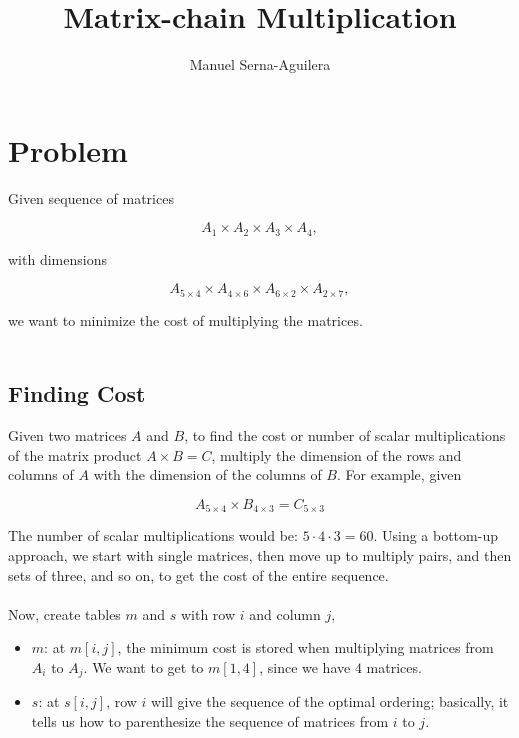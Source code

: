 \documentclass[12pt]{article}
\title{Matrix-chain Multiplication}
\author{Manuel Serna-Aguilera}
\date{}
\begin{document}
\maketitle

\section*{Problem}
Given sequence of matrices

\begin{equation*}
    A_1 \times A_2 \times A_3 \times A_4,
\end{equation*}

with dimensions

\begin{equation*}
    A_{5\times4} \times A_{4\times6} \times A_{6\times2} \times A_{2\times7},
\end{equation*}

we want to minimize the cost of multiplying the matrices. 
\\ \\
\subsection*{Finding Cost}
Given two matrices $A$ and $B$, to find the cost or number of scalar multiplications of the matrix product $A \times B = C$, multiply the dimension of the rows and columns of $A$ with the dimension of the columns of $B$. For example, given 

\begin{equation*}
    A_{5 \times 4} \times B_{4 \times 3} = C_{5 \times 3}
\end{equation*}

The number of scalar multiplications would be: $5 \cdot 4 \cdot 3 = 60$. Using a bottom-up approach, we start with single matrices, then move up to multiply pairs, and then sets of three, and so on, to get the cost of the entire sequence.
\\ \\
Now, create tables $m$ and $s$ with row $i$ and column $j$,
\begin{itemize}
    \item $m$: at $m[i, j]$, the minimum cost is stored when multiplying matrices from $A_i$ to $A_j$. We want to get to $m[1, 4]$, since we have $4$ matrices.
    
    \item $s$: at $s[i, j]$, row $i$ will give the sequence of the optimal ordering; basically, it tells us how to parenthesize the sequence of matrices from $i$ to $j$.
\end{itemize}
\end{document}
